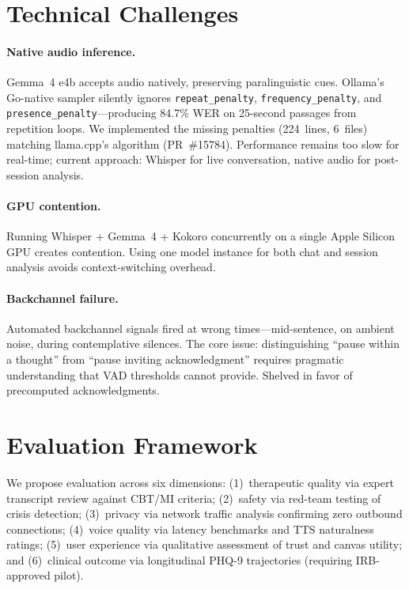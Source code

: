 \documentclass{article}
\begin{document}
\section{Technical Challenges}

\paragraph{Native audio inference.} Gemma~4 e4b accepts audio natively, preserving paralinguistic cues. Ollama's Go-native sampler silently ignores \texttt{repeat\_penalty}, \texttt{frequency\_penalty}, and \texttt{presence\_penalty}---producing 84.7\% WER on 25-second passages from repetition loops. We implemented the missing penalties (224~lines, 6~files) matching llama.cpp's algorithm (PR~\#15784). Performance remains too slow for real-time; current approach: Whisper for live conversation, native audio for post-session analysis.

\paragraph{GPU contention.} Running Whisper + Gemma~4 + Kokoro concurrently on a single Apple Silicon GPU creates contention. Using one model instance for both chat and session analysis avoids context-switching overhead.

\paragraph{Backchannel failure.} Automated backchannel signals fired at wrong times---mid-sentence, on ambient noise, during contemplative silences. The core issue: distinguishing ``pause within a thought'' from ``pause inviting acknowledgment'' requires pragmatic understanding that VAD thresholds cannot provide. Shelved in favor of precomputed acknowledgments.

\section{Evaluation Framework}

We propose evaluation across six dimensions: (1)~therapeutic quality via expert transcript review against CBT/MI criteria; (2)~safety via red-team testing of crisis detection; (3)~privacy via network traffic analysis confirming zero outbound connections; (4)~voice quality via latency benchmarks and TTS naturalness ratings; (5)~user experience via qualitative assessment of trust and canvas utility; and (6)~clinical outcome via longitudinal PHQ-9 trajectories (requiring IRB-approved pilot).
\end{document}
